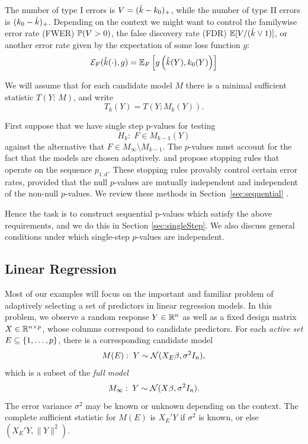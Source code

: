 \documentclass{article}
\begin{document}
The number of type I errors is $V=(\hk-k_0)_+$, while the number of type II errors is $(k_0-\hk)_+$. Depending on the context we might want to control the familywise error rate (FWER) $\P(V>0)$, the false discovery rate (FDR) $\E[V/(\hk \vee 1)]$, or another error rate given by the expectation of some loss function $g$:
\begin{equation}\label{eq:errRate}
\Err_F(\hk(\cdot), g) = \E_F\left[ g\left(\hk(Y), k_0(Y)\right)\right]
\end{equation}

We will assume that for each candidate model $M$ there is a minimal sufficient statistic $T(Y; \,M)$, and write
\[
T_k(Y) = T(Y; M_k(Y)).
\]

First suppose that we have single step p-values for testing
\[
H_{k}:\; F\in M_{k-1}(Y)
\]
against the alternative that $F\in M_\infty\setminus M_{k-1}$. The $p$-values must account for the fact that the models are chosen adaptively. 
\citet{gsell2013sequential} and \citet{li2015accumulation} propose stopping rules that operate on the sequence $p_{1:d}$. These stopping rules provably control certain error rates, provided that the null $p$-values are mutually independent and independent of the non-null $p$-values. 
We review these methods in Section~\ref{sec:sequential} .

Hence the task is to  construct sequential p-values which satisfy the above requirements, and we do this in Section \ref{sec:singleStep}.
We also discuss general conditions under which single-step $p$-values are independent.


\subsection{Linear Regression}

Most of our examples will focus on the important and familiar problem of adaptively selecting a set of predictors in linear regression models. In this problem, we observe a random response $Y\in \R^n$ as well as a fixed design matrix $X\in \R^{n \times p}$, whose columns correspond to candidate predictors. For each {\em active set} $E \sub \{1,\ldots,p\}$, there is a corresponding candidate model
\[
M(E):\; Y \sim \cN( X_E\beta, \sigma^2 I_n),
\]
which is a subset of the {\em full model}
\[
M_\infty:\; Y \sim \cN(X\beta, \sigma^2I_n).
\]
The error variance $\sigma^2$ may be known or unknown depending on the context. The complete sufficient statistic for $M(E)$ is $X_E'Y$ if $\sigma^2$ is known, or else $\left(X_E'Y, \|Y\|^2\right)$.
\end{document}
